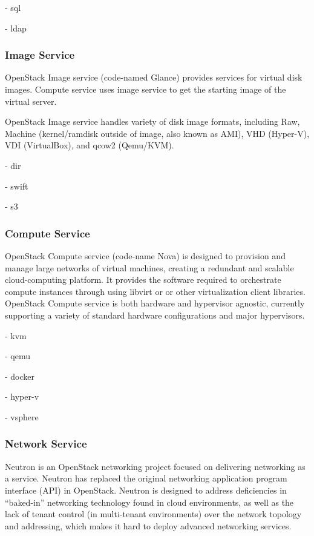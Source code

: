 - sql	

- ldap

\subsubsection{Image Service}

OpenStack Image service (code-named Glance) provides services for virtual disk images. Compute service uses image service to get the starting image of the virtual server.

OpenStack Image service handles variety of disk image formats, including Raw, Machine (kernel/ramdisk outside of image, also known as AMI), VHD (Hyper-V), VDI (VirtualBox), and qcow2 (Qemu/KVM).

- dir

- swift

- s3

\subsubsection{Compute Service}

OpenStack Compute service (code-name Nova) is designed to provision and manage large networks of virtual machines, creating a redundant and scalable cloud-computing platform.  It provides the software required to orchestrate compute instances through using libvirt or or other virtualization client libraries. OpenStack Compute service is both hardware and hypervisor agnostic, currently supporting a variety of standard hardware configurations and major hypervisors.

- kvm

- qemu

- docker

- hyper-v

- vsphere

\subsubsection{Network Service}

Neutron is an OpenStack networking project focused on delivering networking as a service. Neutron has replaced the original networking application program interface (API) in OpenStack. Neutron is designed to address deficiencies in “baked-in” networking technology found in cloud environments, as well as the lack of tenant control (in multi-tenant environments) over the network topology and addressing, which makes it hard to deploy advanced networking services.


